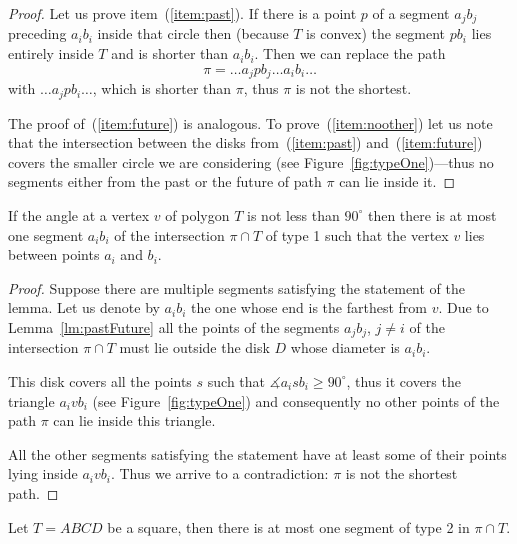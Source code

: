 \documentclass[a4paper,11pt]{article}
\begin{document}
\begin{proof} Let us prove item~(\ref{item:past}). If there is a point $p$ of a segment $a_jb_j$ preceding $a_ib_i$ inside that circle then (because $T$ is convex) the segment $pb_i$ lies entirely inside $T$ and is shorter than $a_ib_i$. Then we can replace the path
	$$\pi = \ldots a_jpb_j \ldots a_ib_i \ldots$$
with $\ldots a_jpb_i \ldots$, which is shorter than $\pi$, thus $\pi$ is not the shortest.

	The proof of~(\ref{item:future}) is analogous. To prove~(\ref{item:noother}) let us note that the intersection between the disks from~(\ref{item:past}) and~(\ref{item:future}) covers the smaller circle we are considering (see Figure~\ref{fig:typeOne})—thus no segments either from the past or the future of path $\pi$ can lie inside it.\end{proof}

\begin{figure}[h]
	
\end{figure}

\begin{lemma}
\label{lm:typeOne}
	If the angle at a vertex $v$ of polygon $T$ is not less than $90^\circ$ then there is at most one segment $a_ib_i$ of the intersection $\pi \cap T$ of type 1 such that the vertex $v$ lies between points $a_i$ and $b_i$.
\end{lemma}

\begin{proof} Suppose there are multiple segments satisfying the statement of the lemma. Let us denote by $a_ib_i$ the one whose end is the farthest from $v$. Due to Lemma~\ref{lm:pastFuture} all the points of the segments $a_jb_j$, $j \ne i$ of the intersection $\pi \cap T$ must lie outside the disk $D$ whose diameter is $a_ib_i$.
	
	This disk covers all the points $s$ such that $\measuredangle a_isb_i \ge 90^\circ$, thus it covers the triangle $a_ivb_i$ (see Figure~\ref{fig:typeOne}) and consequently no other points of the path $\pi$ can lie inside this triangle.

	All the other segments satisfying the statement have at least some of their points lying inside $a_ivb_i$. Thus we arrive to a contradiction: $\pi$ is not the shortest path.\end{proof}

\begin{lemma}
\label{lm:squareTypeTwo}
	Let $T = ABCD$ be a square, then there is at most one segment
	of type 2 in $\pi \cap T$.
\end{lemma}
\end{document}
